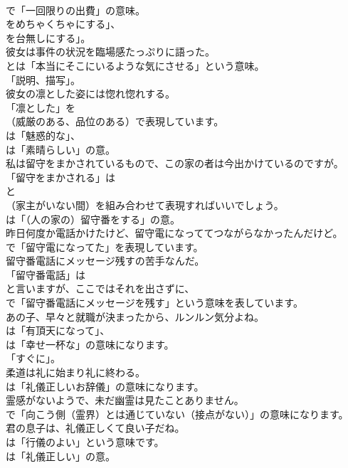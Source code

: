 \documentclass[8pt]{extreport}
\begin{document}
\begin{CJK}{UTF8}{min}
\\	で「一回限りの出費」の意味。
\\	をめちゃくちゃにする」、
\\	を台無しにする」。	
\\	彼女は事件の状況を臨場感たっぷりに語った。 
\\	とは「本当にそこにいるような気にさせる」という意味。
\\	「説明、描写」。	
\\	彼女の凛とした姿には惚れ惚れする。 
\\	「凛とした」を 
\\	（威厳のある、品位のある）で表現しています。
\\	は「魅惑的な」、
\\	は「素晴らしい」の意。	
\\	私は留守をまかされているもので、この家の者は今出かけているのですが。 
\\	「留守をまかされる」は
\\	と
\\	（家主がいない間）を組み合わせて表現すればいいでしょう。
\\	は「（人の家の）留守番をする」の意。	
\\	昨日何度か電話かけたけど、留守電になっててつながらなかったんだけど。 
\\	で「留守電になってた」を表現しています。	
\\	留守番電話にメッセージ残すの苦手なんだ。 
\\	「留守番電話」は
\\	と言いますが、ここではそれを出さずに、
\\	で「留守番電話にメッセージを残す」という意味を表しています。	
\\	あの子、早々と就職が決まったから、ルンルン気分よね。 
\\	は「有頂天になって」、
\\	は「幸せ一杯な」の意味になります。
\\	「すぐに」。	
\\	柔道は礼に始まり礼に終わる。 
\\	は「礼儀正しいお辞儀」の意味になります。	
\\	霊感がないようで、未だ幽霊は見たことありません。 
\\	で「向こう側（霊界）とは通じていない（接点がない）」の意味になります。	
\\	君の息子は、礼儀正しくて良い子だね。 
\\	は「行儀のよい」という意味です。
\\	は「礼儀正しい」の意。	

\end{CJK}
\end{document}
